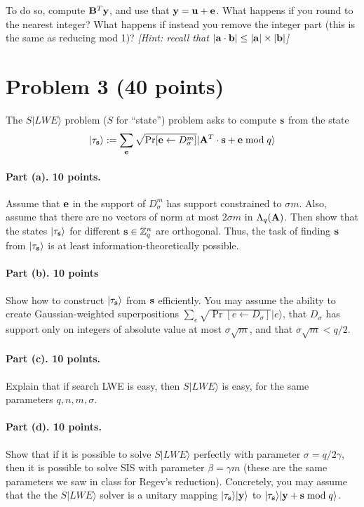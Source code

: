 \documentclass{article}
\begin{document}
To do so, compute ${\mathbf{B}}^T{\mathbf{y}}$, and use that ${\mathbf{y}}={\mathbf{u}}+{\mathbf{e}}$. What happens if you round to the nearest integer? What happens if instead you remove the integer part (this is the same as reducing mod 1)?
\emph{[Hint: recall that $|{\mathbf{a}}\cdot{\mathbf{b}}|\leq |{\mathbf{a}}|\times|{\mathbf{b}}|$]}







\section{Problem 3 (40 points)}

The $S|LWE\rangle$ problem ($S$ for ``state'') problem asks to compute ${\mathbf{s}}$ from the state
\[|\tau_{\mathbf{s}}\rangle:=\sum_{{\mathbf{e}}}\sqrt{\Pr[{\mathbf{e}}\gets D^m_\sigma]}|{\mathbf{A}}^T\cdot{\mathbf{s}}+{\mathbf{e}}\bmod q\rangle\]

\paragraph{Part (a). 10 points.} Assume that ${\mathbf{e}}$ in the support of $D_{\sigma}^m$ has support constrained to $\sigma m$. Also, assume that there are no vectors of norm at most $2\sigma m$ in $\Lambda_q({\mathbf{A}})$. Then show that the states $|\tau_{\mathbf{s}}\rangle$ for different ${\mathbf{s}}\in{\mathbb{Z}}_q^n$ are orthogonal. Thus, the task of finding ${\mathbf{s}}$ from $|\tau_{\mathbf{s}}\rangle$ is at least information-theoretically possible.

\paragraph{Part (b). 10 points} Show how to construct $|\tau_{\mathbf{s}}\rangle$ from ${\mathbf{s}}$ efficiently. You may assume the ability to create Gaussian-weighted superpositions $\sum_e\sqrt{\Pr[e\gets D_\sigma]}|e\rangle$, that $D_\sigma$ has support only on integers of absolute value at most $\sigma \sqrt{m}$, and that $\sigma\sqrt{m}<q/2$. 

\paragraph{Part (c). 10 points.} Explain that if search LWE is easy, then $S|LWE\rangle$ is easy, for the same parameters $q,n,m,\sigma$. 


\paragraph{Part (d). 10 points. } Show that if it is possible to solve $S|LWE\rangle$ perfectly with parameter $\sigma=q/2\gamma$, then it is possible to solve SIS with parameter $\beta=\gamma m$ (these are the same parameters we saw in class for Regev's reduction). Concretely, you may assume that the the $S|LWE\rangle$ solver is a unitary mapping $|\tau_{\mathbf{s}}\rangle|{\mathbf{y}}\rangle$ to $|\tau_{\mathbf{s}}\rangle|{\mathbf{y}}+{\mathbf{s}}\bmod q\rangle$.
\end{document}
